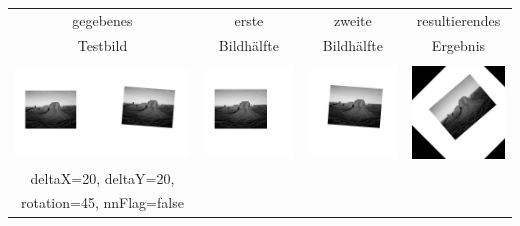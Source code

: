 \documentclass[12pt,german]{article}
\begin{document}
\begin{table}[H]
  \centering
  \begin{tabular}{| c | c | c | c |}
	\hline
	gegebenes & erste & zweite & resultierendes \\	
	Testbild & Bildhälfte & Bildhälfte & Ergebnis \\ 
    \hline
     & & & \\
    \includegraphics[width=5cm]{images/register/gray1.jpg}  &
    \includegraphics[width=2.5cm]{images/register/first-half-image-01.jpg} &
    \includegraphics[width=2.5cm]{images/register/second-half-image-01.jpg} &
    \includegraphics[width=2.5cm]{images/register/transformed-image-01.jpg} \\
    
	deltaX=20, deltaY=20, & & & \\
	rotation=45, nnFlag=false & & & \\
    

\end{tabular}
\end{table}
\end{document}
